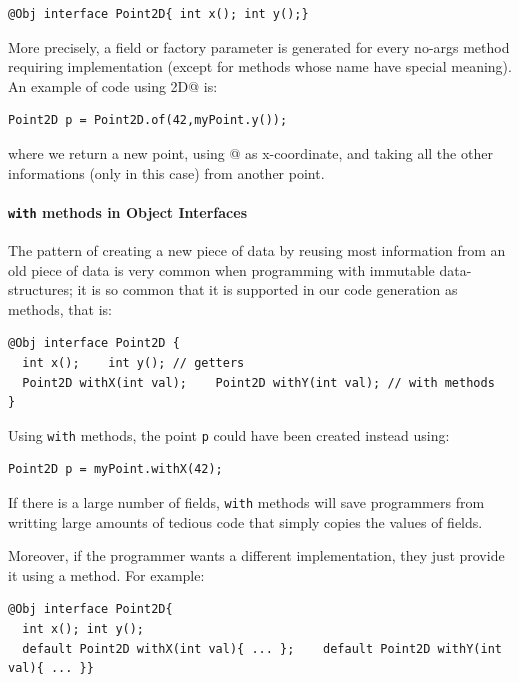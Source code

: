 \begin{lstlisting}
@Obj interface Point2D{ int x(); int y();}
\end{lstlisting}

\noindent More precisely, a field or factory parameter is generated for every
no-args method requiring implementation (except for methods whose name have
special meaning).  An example of code using \Q@Point2D@ is:

\begin{lstlisting}
Point2D p = Point2D.of(42,myPoint.y());
\end{lstlisting}

\noindent where we return a new point, using @ as x-coordinate,
and taking all the other informations (only \Q@y@ in this case) from
another point.

\paragraph{\texttt{with} methods in Object Interfaces}
The pattern of creating a new piece of data by reusing most
information from an old piece of data is very common
when programming with immutable data-structures; it is so common that
it is supported in our code generation as \Q@with@ methods,
that is:
\begin{lstlisting}
@Obj interface Point2D { 
  int x();    int y(); // getters
  Point2D withX(int val);    Point2D withY(int val); // with methods
}
\end{lstlisting}

\noindent Using \texttt{with} methods, the point \texttt{p} could have
been created instead using:

\begin{lstlisting}
Point2D p = myPoint.withX(42);
\end{lstlisting}

\noindent If there is a large number of fields, \texttt{with} methods
will save programmers from writting large amounts of tedious code that
simply copies the values of fields. 

Moreover, if the programmer wants a different implementation, they
just provide it using a \Q@default@ method. For example:
\begin{lstlisting}
@Obj interface Point2D{ 
  int x(); int y();
  default Point2D withX(int val){ ... };    default Point2D withY(int val){ ... }}
\end{lstlisting}

